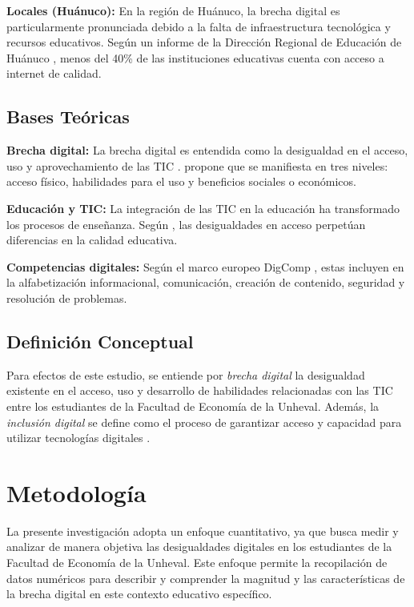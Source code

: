 \documentclass[12pt, a4paper]{article}
\begin{document}
\textbf{Locales (Huánuco):} En la región de Huánuco, la brecha digital es particularmente pronunciada debido a la falta de infraestructura tecnológica y recursos educativos. Según un informe de la Dirección Regional de Educación de Huánuco \parencite{dreh2023}, menos del 40\% de las instituciones educativas cuenta con acceso a internet de calidad.

\subsection{Bases Teóricas}

\textbf{Brecha digital:} La brecha digital es entendida como la desigualdad en el acceso, uso y aprovechamiento de las TIC \parencite{unesco2019}. \textcite{vandijk2020} propone que se manifiesta en tres niveles: acceso físico, habilidades para el uso y beneficios sociales o económicos.

\textbf{Educación y TIC:} La integración de las TIC en la educación ha transformado los procesos de enseñanza. Según \textcite{coll2021}, las desigualdades en acceso perpetúan diferencias en la calidad educativa.

\textbf{Competencias digitales:} Según el marco europeo DigComp \parencite{ferrari2013}, estas incluyen en la alfabetización informacional, comunicación, creación de contenido, seguridad y resolución de problemas.

\subsection{Definición Conceptual}

Para efectos de este estudio, se entiende por \textit{brecha digital} la desigualdad existente en el acceso, uso y desarrollo de habilidades relacionadas con las TIC entre los estudiantes de la Facultad de Economía de la Unheval. Además, la \textit{inclusión digital} se define como el proceso de garantizar acceso y capacidad para utilizar tecnologías digitales \parencite{unesco2019}.

\section{Metodología}

La presente investigación adopta un enfoque cuantitativo, ya que busca medir y analizar de manera objetiva las desigualdades digitales en los estudiantes de la Facultad de Economía de la Unheval. Este enfoque permite la recopilación de datos numéricos para describir y comprender la magnitud y las características de la brecha digital en este contexto educativo específico.  
\end{document}
